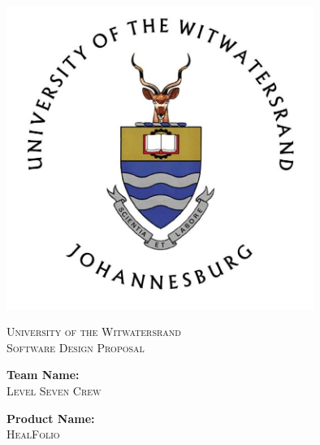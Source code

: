 \documentclass[a4paper]{article}
\begin{document}
\begin{titlepage}

\centering

\vfill

\includegraphics[width=10cm]{Images/Wits-logo1.jpg}

\vskip 0.1cm

\center 

\textsc{\LARGE University of the Witwatersrand}\\[0.5cm] 

\textsc{\Large Software Design Proposal} \\[0.5cm] 

\begin{minipage}{0.4\textwidth}

\begin{center} \large

\textbf{Team Name:} \\[0.3cm]

\textsc{Level Seven Crew} \\[0.3cm]

\end{center}

\begin{center} \large

\textbf{Product Name:} \\[0.3cm]

\textsc{HealFolio} \\[0.3cm]

\end{center}

\begin{flushleft} \large


\end{flushleft}
\end{minipage}
\end{titlepage}
\end{document}
